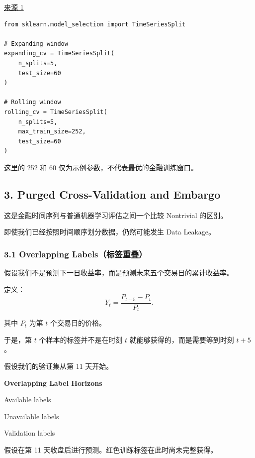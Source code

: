 \href{https://scikit-learn.org/stable/modules/generated/sklearn.model_selection.TimeSeriesSplit}{来源 1}

\begin{verbatim}
from sklearn.model_selection import TimeSeriesSplit

# Expanding window
expanding_cv = TimeSeriesSplit(
    n_splits=5,
    test_size=60
)

# Rolling window
rolling_cv = TimeSeriesSplit(
    n_splits=5,
    max_train_size=252,
    test_size=60
)
\end{verbatim}

这里的 252 和 60 仅为示例参数，不代表最优的金融训练窗口。

\hypertarget{part-2-27-0001-purged-cross-validation-and-embargo}{%
\subsection{3. Purged Cross-Validation and Embargo}\label{part-2-27-0001-purged-cross-validation-and-embargo}}

这是金融时间序列与普通机器学习评估之间一个比较 Nontrivial 的区别。

即使我们已经按照时间顺序划分数据，仍然可能发生 Data Leakage。

\hypertarget{part-2-27-0001-overlapping-labelsux6807ux7b7eux91cdux53e0}{%
\subsubsection{3.1 Overlapping Labels（标签重叠）}\label{part-2-27-0001-overlapping-labelsux6807ux7b7eux91cdux53e0}}

假设我们不是预测下一日收益率，而是预测未来五个交易日的累计收益率。

定义：
\[Y_t=\frac{P_{t+5}-P_t}{P_t}.\]

其中 \(P_t\) 为第 \(t\) 个交易日的价格。

于是，第 \(t\) 个样本的标签并不是在时刻 \(t\) 就能够获得的，而是需要等到时刻 \(t+5\)。

假设我们的验证集从第 11 天开始。

\textbf{Overlapping Label Horizons}


Available labels

Unavailable labels

Validation labels

假设在第 11 天收盘后进行预测。红色训练标签在此时尚未完整获得。

